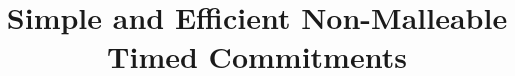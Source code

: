 \documentclass{llncs}
\begin{document}
\title{Simple and Efficient Non-Malleable Timed Commitments}




\maketitle
%


















\begin{appendix}





\end{appendix}
\end{document}
